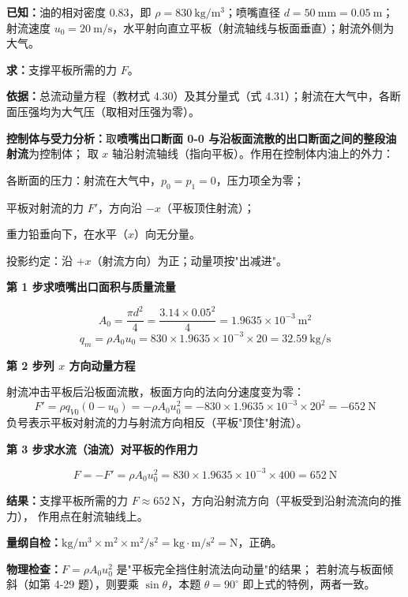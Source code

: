 \begin{jie}
\textbf{已知：}油的相对密度 $0.83$，即 $\rho=830\ \mathrm{kg/m^3}$；喷嘴直径 $d=50\ \mathrm{mm}=0.05\ \mathrm{m}$；
射流速度 $u_0=20\ \mathrm{m/s}$，水平射向直立平板（射流轴线与板面垂直）；射流外侧为大气。

\textbf{求：}支撑平板所需的力 $F$。

\textbf{依据：}总流动量方程（教材式 4.30）及其分量式（式 4.31）；射流在大气中，各断面压强均为大气压（取相对压强为零）。

\textbf{控制体与受力分析：}取\textbf{喷嘴出口断面 0-0 与沿板面流散的出口断面之间的整段油射流}为控制体；
取 $x$ 轴沿射流轴线（指向平板）。作用在控制体内油上的外力：
\begin{xiaowen}
\item 各断面的压力：射流在大气中，$p_0=p_1=0$，压力项全为零；
\item 平板对射流的力 $F'$，方向沿 $-x$（平板顶住射流）；
\item 重力铅垂向下，在水平（$x$）向无分量。
\end{xiaowen}
投影约定：沿 $+x$（射流方向）为正；动量项按"出减进"。

\textbf{第 1 步\quad 求喷嘴出口面积与质量流量}

\[ A_0=\frac{\pi d^2}{4}=\frac{3.14\times0.05^2}{4}=1.9635\times10^{-3}\ \mathrm{m^2} \]
\[ q_m=\rho A_0u_0=830\times1.9635\times10^{-3}\times20=32.59\ \mathrm{kg/s} \]

\textbf{第 2 步\quad 列 $x$ 方向动量方程}

射流冲击平板后沿板面流散，板面方向的法向分速度变为零：
\[ F'=\rho q_{V0}\left(0-u_0\right)=-\rho A_0u_0^2
   =-830\times1.9635\times10^{-3}\times20^2=-652\ \mathrm{N} \]
负号表示平板对射流的力与射流方向相反（平板"顶住"射流）。

\textbf{第 3 步\quad 求水流（油流）对平板的作用力}

\[ F=-F'=\rho A_0u_0^2=830\times1.9635\times10^{-3}\times400=652\ \mathrm{N} \]

\textbf{结果：}支撑平板所需的力 $F\approx652\ \mathrm{N}$，方向沿射流方向（平板受到沿射流流向的推力），
作用点在射流轴线上。

\textbf{量纲自检：}$\mathrm{kg/m^3\times m^2\times m^2/s^2}=\mathrm{kg\cdot m/s^2}=\mathrm{N}$，正确。

\textbf{物理检查：}$F=\rho A_0u_0^2$ 是"平板完全挡住射流法向动量"的结果；
若射流与板面倾斜（如第 4-29 题），则要乘 $\sin\theta$，本题 $\theta=90^\circ$ 即上式的特例，两者一致。
\end{jie}

